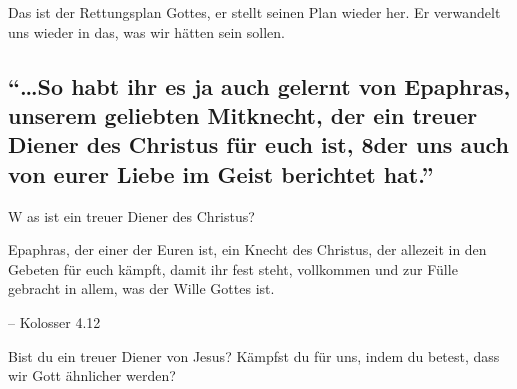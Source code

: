\documentclass[
  12pt,
]{krantz}
\makeatletter
\newenvironment{kframe}{%
\medskip{}
\setlength{\fboxsep}{.8em}
 \def\at@end@of@kframe{}%
 \ifinner\ifhmode%
  \def\at@end@of@kframe{\end{minipage}}%
  \begin{minipage}{\columnwidth}%
 \fi\fi%
 \def\FrameCommand##1{\hskip\@totalleftmargin \hskip-\fboxsep
 \colorbox{shadecolor}{##1}\hskip-\fboxsep
     \hskip-\linewidth \hskip-\@totalleftmargin \hskip\columnwidth}%
 \MakeFramed {\advance\hsize-\width
   \@totalleftmargin\z@ \linewidth\hsize
   \@setminipage}}%
 {\par\unskip\endMakeFramed%
 \at@end@of@kframe}
\newenvironment{rmdblock}[1]
  {
  \begin{itemize}
  \renewcommand{\labelitemi}{
    \raisebox{-.7\height}[0pt][0pt]{
      {\setkeys{Gin}{width=3em,keepaspectratio}\texttt{[image: img/\#1]}}
    }
  }
  \setlength{\fboxsep}{1em}
  \begin{kframe}
  \item
  }
  {
  \end{kframe}
  \end{itemize}
  }
\newenvironment{rmdquestion}
  {\begin{rmdblock}{question}}
  {\end{rmdblock}}
\newenvironment{rmdquote}
  {\begin{rmdblock}{quote}}
  {\end{rmdblock}}
\makeatother
\begin{document}
Das ist der Rettungsplan Gottes, er stellt seinen Plan wieder her. Er verwandelt uns wieder in das, was wir hätten sein sollen.

\hypertarget{so-habt-ihr-es-ja-auch-gelernt-von-epaphras-unserem-geliebten-mitknecht-der-ein-treuer-diener-des-christus-fuxfcr-euch-ist-8der-uns-auch-von-eurer-liebe-im-geist-berichtet-hat.}{%
\subsection{``\ldots So habt ihr es ja auch gelernt von Epaphras, unserem geliebten Mitknecht, der ein treuer Diener des Christus für euch ist, 8der uns auch von eurer Liebe im Geist berichtet hat.''}\label{so-habt-ihr-es-ja-auch-gelernt-von-epaphras-unserem-geliebten-mitknecht-der-ein-treuer-diener-des-christus-fuxfcr-euch-ist-8der-uns-auch-von-eurer-liebe-im-geist-berichtet-hat.}}

W as ist ein treuer Diener des Christus?

\begin{rmdquote}
Epaphras, der einer der Euren ist, ein Knecht des Christus, der allezeit
in den Gebeten für euch kämpft, damit ihr fest steht, vollkommen und zur
Fülle gebracht in allem, was der Wille Gottes ist.

-- Kolosser 4.12
\end{rmdquote}

\begin{rmdquestion}
Bist du ein treuer Diener von Jesus? Kämpfst du für uns, indem du
betest, dass wir Gott ähnlicher werden?
\end{rmdquestion}

  

\printindex
\end{document}
